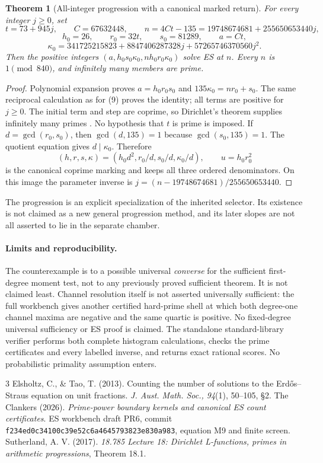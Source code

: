 \documentclass[10pt,a4paper]{article}
\newtheorem{theorem}{Theorem}
\begin{document}
\begin{theorem}[All-integer progression with a canonical marked return]
For every integer $j\ge0$, set
\[
 t=73+945j,\qquad C=67632448,\qquad
 n=4Ct-135=19748674681+255650653440j,
\]
\[
 h_0=26,\qquad r_0=32t,\qquad s_0=81289,\qquad a=Ct,
\]
\[
 \kappa_0=341725215823+8847406287328j+57265746370560j^2.
\]
Then the positive integers $(a,h_0s_0\kappa_0,nh_0r_0\kappa_0)$ solve ES at $n$.
Every $n$ is $1\pmod{840}$, and infinitely many members are prime.
\end{theorem}
\begin{proof}
Polynomial expansion proves $a=h_0r_0s_0$ and
$135\kappa_0=nr_0+s_0$. The same reciprocal calculation as for (9) proves the
identity; all terms are positive for $j\ge0$. The initial term and step are
coprime, so Dirichlet's theorem supplies infinitely many primes
\cite[Theorem 18.1]{Dirichlet}. No hypothesis that $t$ is prime is imposed.
If $d=\gcd(r_0,s_0)$, then $\gcd(d,135)=1$ because $\gcd(s_0,135)=1$.
The quotient equation gives $d\mid\kappa_0$. Therefore
\[
 (h,r,s,\kappa)=(h_0d^2,r_0/d,s_0/d,\kappa_0/d),\qquad u=h_0r_0^2
\]
is the canonical coprime marking and keeps all three ordered denominators.
On this image the parameter inverse is
$j=(n-19748674681)/255650653440$.
\end{proof}
The progression is an explicit specialization of the inherited selector.
Its existence is not claimed as a new general progression method, and its
later slopes are not all asserted to lie in the separate chamber.

\paragraph{Limits and reproducibility.}
The counterexample is to a possible universal \emph{converse} for the sufficient
first-degree moment test, not to any previously proved sufficient theorem.
It is not claimed least. Channel resolution itself is not asserted universally
sufficient: the full workbench gives another certified hard-prime shell at
which both degree-one channel maxima are negative and the same quartic is
positive. No fixed-degree universal sufficiency or ES proof is claimed.
The standalone standard-library verifier performs both complete histogram
calculations, checks the prime certificates and every labelled inverse, and
returns exact rational scores. No probabilistic primality assumption enters.

\begin{thebibliography}{3}\small
{} Elsholtz, C., \& Tao, T. (2013). Counting the number of solutions
to the Erd\H{o}s--Straus equation on unit fractions. \emph{J. Aust. Math. Soc.,
94}(1), 50--105, \S2.
 The Clankers (2026). \emph{Prime-power boundary kernels and
canonical ES count certificates}. ES workbench draft PR6, commit
\texttt{f234ed0c34100c39e52c6a4645793823e830a983}, equation M9 and finite screen.
 Sutherland, A. V. (2017). \emph{18.785 Lecture 18:
Dirichlet L-functions, primes in arithmetic progressions}, Theorem 18.1.
\end{thebibliography}
\end{document}
